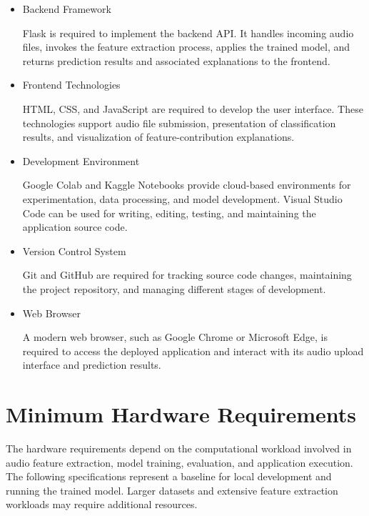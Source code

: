 \documentclass[12pt,a4paper]{report}
\begin{document}
\begin{itemize}
    \item Backend Framework

    Flask is required to implement the backend API. It handles incoming audio files, invokes the feature extraction process, applies the trained model, and returns prediction results and associated explanations to the frontend.

    \item Frontend Technologies

    HTML, CSS, and JavaScript are required to develop the user interface. These technologies support audio file submission, presentation of classification results, and visualization of feature-contribution explanations.

    \item Development Environment

    Google Colab and Kaggle Notebooks provide cloud-based environments for experimentation, data processing, and model development. Visual Studio Code can be used for writing, editing, testing, and maintaining the application source code.

    \item Version Control System

    Git and GitHub are required for tracking source code changes, maintaining the project repository, and managing different stages of development.

    \item Web Browser

    A modern web browser, such as Google Chrome or Microsoft Edge, is required to access the deployed application and interact with its audio upload interface and prediction results.

\end{itemize}

\section{Minimum Hardware Requirements}

The hardware requirements depend on the computational workload involved in audio feature extraction, model training, evaluation, and application execution. The following specifications represent a baseline for local development and running the trained model. Larger datasets and extensive feature extraction workloads may require additional resources.
\end{document}
